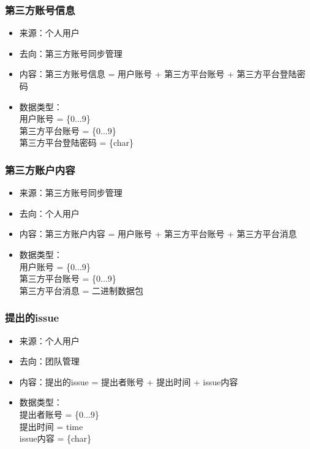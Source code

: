             \subsubsection{\color{red} 第三方账号信息}
            \begin{itemize}
                \item 来源：个人用户
                \item 去向：第三方账号同步管理
                \item 内容：第三方账号信息 = 用户账号 + 第三方平台账号 + 第三方平台登陆密码
                \item 数据类型：\\
                    用户账号 = \{0...9\}\\
                    第三方平台账号 = \{0...9\}\\
                    第三方平台登陆密码 = \{char\}\\
            \end{itemize}
            \subsubsection{\color{red} 第三方账户内容}
            \begin{itemize}
                \item 来源：第三方账号同步管理
                \item 去向：个人用户
                \item 内容：第三方账户内容 = 用户账号 + 第三方平台账号 + 第三方平台消息
                \item 数据类型：\\
                    用户账号 = \{0...9\}\\
                    第三方平台账号 = \{0...9\}\\
                    第三方平台消息 = 二进制数据包\\
            \end{itemize}
            \subsubsection{\color{red} 提出的issue}
            \begin{itemize}
                \item 来源：个人用户
                \item 去向：团队管理
                \item 内容：提出的issue = 提出者账号 + 提出时间 + issue内容
                \item 数据类型：\\
                    提出者账号 = \{0...9\}\\
                    提出时间 = time\\
                    issue内容 = \{char\}\\
            \end{itemize}
